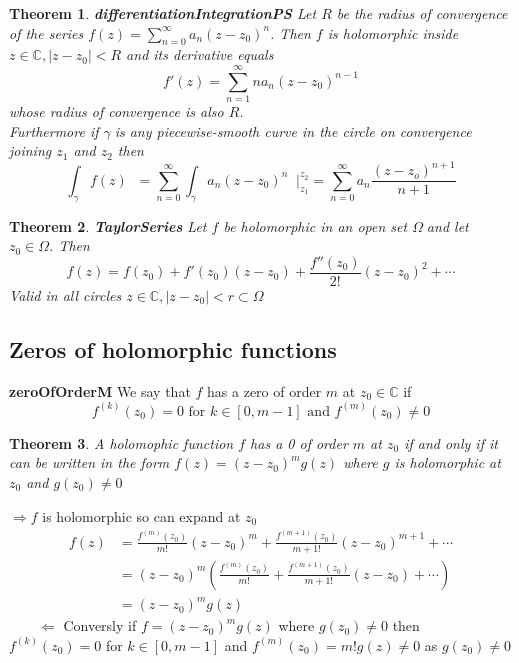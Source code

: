 \documentclass{article}
\newtheorem{theorem}{Theorem}[section]
\newenvironment{proof}[1][Proof]{\begin{trivlist}
\item[\hskip \labelsep {\bfseries #1}]}{\end{trivlist}}
\newenvironment{definition}[1][Definition]{\begin{trivlist}
\item[\hskip \labelsep {\bfseries #1}]}{\end{trivlist}}
\newcommand{\C}{\mathbb{C}}
\newcommand{\OO}{$ \Omega \;$}
\newcommand{\GG}{$ \gamma \;$}
\newcommand{\SumI}{\sum_{n = 0}^\infty}
\newcommand{\CSeries}{\SumI a_n(z-z_0)^n}
\begin{document}
\begin{theorem} \label{differentiationIntegrationPS} \textbf{differentiationIntegrationPS}
    Let $R$ be the radius of convergence of the series $f(z) = \CSeries$.
    Then $f$ is holomorphic inside ${z \in \C, |z-z_0| < R}$ and its derivative equals
    \[f'(z) = \sum_{n = 1}^\infty na_n(z-z_0)^{n-1}\]
    whose radius of convergence is also $R$.\\
    Furthermore if \GG is any piecewise-smooth curve in the circle on convergence
    joining $z_1$ and $z_2$ then
    \[\int_\gamma f(z) \mathop(dz) = \SumI \int_\gamma a_n(z-z_0)^n \mathop(dz) \biggr\rvert_{z_1}^{z_2} = \SumI a_n \frac{(z-z_o)^{n+1}}{n+1}\]
\end{theorem}

\begin{theorem} \label{TaylorSeries} \textbf{TaylorSeries}
    Let $f$ be holomorphic in an open set \OO and let $z_0 \in \Omega$. Then
    \[f(z) = f(z_0) + f'(z_0)(z-z_0) + \frac{f''(z_0)}{2!}(z-z_0)^2 + \cdots\]
    Valid in all circles ${z \in \C, |z-z_0| < r} \subset \Omega$
\end{theorem}

\subsection*{Zeros of holomorphic functions}
\begin{definition} \label{zeroOfOrderM} \textbf{zeroOfOrderM}
    We say that $f$ has a zero of order $m$ at $z_0 \in \C$ if 
    \[f^{(k)}(z_0) = 0 \text{ for } k \in [0, m-1] \text{ and } f^{(m)}(z_0) \neq 0\]
\end{definition}

\begin{theorem}
    A holomophic function $f$ has a 0 of order $m$ at $z_0$ if and only if it can be written in the form
    $f(z) = (z-z_0)^m g(z)$ where $g$ is holomorphic at $z_0$ and $g(z_0) \neq 0$
\end{theorem}
\begin{proof}
    $\Rightarrow f$ is holomorphic so can expand at $z_0$
    \begin{align*}
        f(z) &= \frac{f^{(m)}(z_0)}{m!}(z-z_0)^m + \frac{f^{(m+1)}(z_0)}{m+1!}(z-z_0)^{m+1} + \cdots\\
             &= (z-z_0)^m\left( \frac{f^{(m)}(z_0)}{m!} + \frac{f^{(m+1)}(z_0)}{m+1!}(z-z_0)+ \cdots\right)\\
             &= (z-z_0)^mg(z)
    \end{align*} 
    $\qquad \Leftarrow$ Conversly if $f = (z-z_0)^m g(z)$ where $g(z_0) \neq 0$ then $f^{(k)}(z_0)=0$ for $k \in [0, m-1]$
    and $f^{(m)}(z_0) = m!g(z) \neq 0$ as $g(z_0) \neq 0$
\end{proof}
\end{document}
